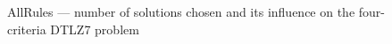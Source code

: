 \begin{figure}
  \centering
  \caption{AllRules --- number of solutions chosen and its influence on the
    four-criteria DTLZ7 problem}
  \label{dtlz7_c4_allrules}
\end{figure}


